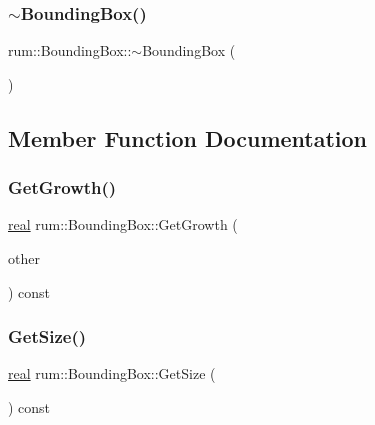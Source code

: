 \mbox{\label{classrum_1_1_bounding_box_a515a617dd779ad1932598f0bb6bd9669}} 
\subsubsection{\texorpdfstring{$\sim$\+Bounding\+Box()}{~BoundingBox()}}
{\footnotesize\ttfamily rum\+::\+Bounding\+Box\+::$\sim$\+Bounding\+Box (\begin{DoxyParamCaption}{ }\end{DoxyParamCaption})}



\subsection{Member Function Documentation}
\mbox{\label{classrum_1_1_bounding_box_a944672fb8a07383cf4409393a62ffc1f}} 
\subsubsection{\texorpdfstring{Get\+Growth()}{GetGrowth()}}
{\footnotesize\ttfamily \hyperlink{namespacerum_a7e8cca23573d5eaead0f138cbaa4862c}{real} rum\+::\+Bounding\+Box\+::\+Get\+Growth (\begin{DoxyParamCaption}\item[{const \hyperlink{classrum_1_1_bounding_box}{Bounding\+Box} \&}]{other }\end{DoxyParamCaption}) const}

\mbox{\label{classrum_1_1_bounding_box_add513abe94c5ad77ff3ec2f29b6d6241}} 
\subsubsection{\texorpdfstring{Get\+Size()}{GetSize()}}
{\footnotesize\ttfamily \hyperlink{namespacerum_a7e8cca23573d5eaead0f138cbaa4862c}{real} rum\+::\+Bounding\+Box\+::\+Get\+Size (\begin{DoxyParamCaption}{ }\end{DoxyParamCaption}) const}


